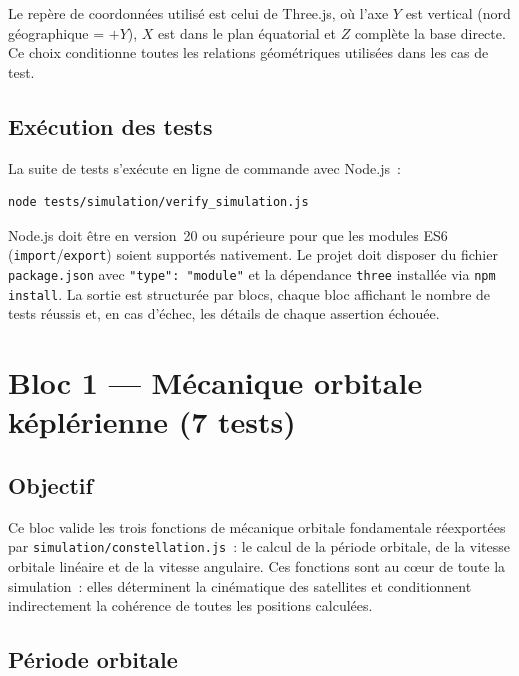 \documentclass[12pt,a4paper]{article}
\begin{document}
Le repère de coordonnées utilisé est celui de Three.js, où l'axe $Y$ est vertical (nord géographique = $+Y$), $X$ est dans le plan équatorial et $Z$ complète la base directe. Ce choix conditionne toutes les relations géométriques utilisées dans les cas de test.

\subsection{Exécution des tests}

La suite de tests s'exécute en ligne de commande avec Node.js~:

\begin{lstlisting}[language=bash, numbers=none]
node tests/simulation/verify_simulation.js
\end{lstlisting}

Node.js doit être en version~20 ou supérieure pour que les modules ES6 (\texttt{import}/\texttt{export}) soient supportés nativement. Le projet doit disposer du fichier \texttt{package.json} avec \texttt{"type": "module"} et la dépendance \texttt{three} installée via \texttt{npm install}. La sortie est structurée par blocs, chaque bloc affichant le nombre de tests réussis et, en cas d'échec, les détails de chaque assertion échouée.

\section{Bloc 1 — Mécanique orbitale képlérienne (7 tests)}

\subsection{Objectif}

Ce bloc valide les trois fonctions de mécanique orbitale fondamentale réexportées par \texttt{simulation/constellation.js}~: le calcul de la période orbitale, de la vitesse orbitale linéaire et de la vitesse angulaire. Ces fonctions sont au cœur de toute la simulation~: elles déterminent la cinématique des satellites et conditionnent indirectement la cohérence de toutes les positions calculées.

\subsection{Période orbitale}
\end{document}
